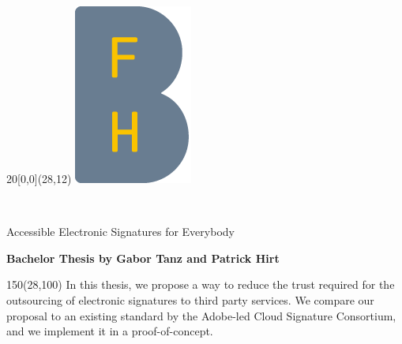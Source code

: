 %
%

\begin{titlepage}


\setlength{\unitlength}{1mm}
\begin{textblock}{20}[0,0](28,12)
	\includegraphics[scale=1.0]{images/BFH_Logo_B.png}
\end{textblock}

\begin{flushleft}

\vspace*{21mm}

\fontsize{26pt}{40pt}\selectfont 
\heading				\\							%
\vspace{2mm}

\fontsize{16pt}{24pt}\selectfont\vspace{0.3em}
Accessible Electronic Signatures for Everybody 			\\				%
\vspace{5mm}

\fontsize{10pt}{12pt}\selectfont
\textbf{Bachelor Thesis by Gabor Tanz and Patrick Hirt} \\		%
\vspace{7mm}

\begin{textblock}{150}(28,100)
\fontsize{10pt}{12pt}\selectfont
    In this thesis, we propose a way to reduce the trust required for the outsourcing of electronic signatures to third party services.
    We compare our proposal to an existing standard by the Adobe-led Cloud Signature Consortium,
    and we implement it in a proof-of-concept.
\end{textblock}


\end{flushleft}
\end{titlepage}
